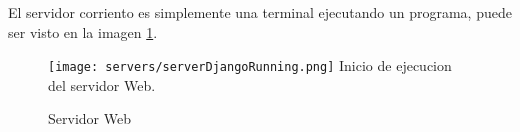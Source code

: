     El servidor corriento es simplemente una terminal ejecutando un programa,
    puede ser visto en la imagen \ref{img:serverWebRunning}.

	\begin{figure}[htb]
		\centering
        \caption{Servidor Web}
        \texttt{[image: servers/serverDjangoRunning.png]}
        Inicio de ejecucion del servidor Web.    \label{img:serverWebRunning}
	\end{figure}



